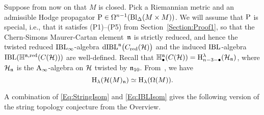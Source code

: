 \documentclass[\MainFolder/Text.tex]{subfiles}
\begin{document}
Suppose from now on that $M$ is closed. Pick a Riemannian metric and an admissible Hodge propagator $\mathrm{P} \in \Omega^{n-1}(\mathrm{Bl}_\Delta(M\times M))$. We will assume that $\mathrm{P}$ is special, i.e., that it satisfes (P1)--(P5) from Section~\ref{Section:Proof1}, so that the Chern-Simons Maurer-Cartan element~$\mathfrak{n}$ is strictly reduced, and hence the twisted reduced $\mathrm{IBL}_\infty$-algebra $\mathrm{dIBL}^{\mathfrak{n}}\bigl(C_{\mathrm{red}}(\mathcal{H})\bigr)$ and the induced $\mathrm{IBL}$-algebra $\mathrm{IBL}(\mathbb{H}^{\mathfrak{n},\mathrm{red}}(C(\mathcal{H})))$ are well-defined.
Recall that $\mathbb{H}^{\mathfrak{n}}_\bullet(C(\mathcal{H})) = \mathrm{H}^{\lambda}_{n-3-\bullet}(\mathcal{H}_{\mathfrak{n}})$, where $\mathcal{H}_{\mathfrak{n}}$ is the $\mathrm{A}_\infty$-algebra on $\mathcal{H}$ twisted by $\mathfrak{n}_{10}$. From~\cite{Cieliebak2018}, we have
\begin{equation}\label{Eq:IBLIsom}
\mathrm{H}_{\lambda}(\mathcal{H}(M)_{\mathfrak{n}}) \simeq \mathrm{H}_{\lambda}(\Omega(M)).
\end{equation}

A combination of \eqref{Eq:StringIsom} and \eqref{Eq:IBLIsom} gives the following version of the string topology conjecture from the Overview. 
\end{document}
